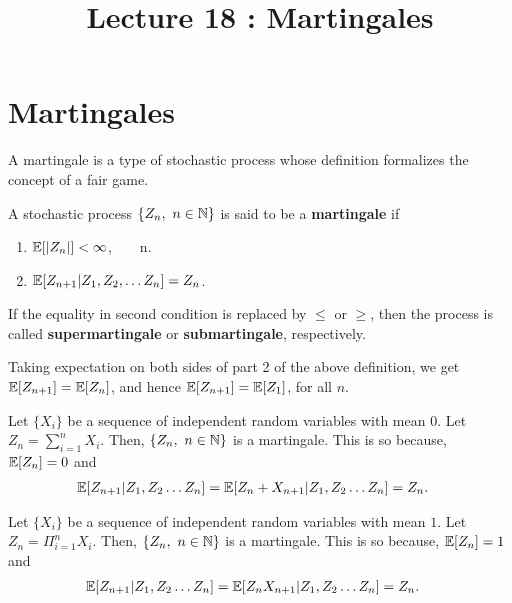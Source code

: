 \documentclass[a4paper,10pt,english]{article}
\title{Lecture 18 : Martingales}
\author{}
\begin{document}
\maketitle
\section{Martingales}
A martingale is a type of stochastic process whose definition formalizes the concept of a fair game.
\begin{defn}
A stochastic process $\{Z_n,~n \in \mathbb{N} \}$ is said to be a \textbf{martingale} if 
\begin{enumerate}
\item $\mathbb{E}[|Z_n|]< \infty$, ~ ~ n.
\item $\mathbb{E}[Z_{n+1}|Z_1,Z_2, \hdots Z_n]=Z_n$.
\end{enumerate}
If the equality in second condition is replaced by $\leq$ or $\geq$, then the process is called \textbf{supermartingale} or \textbf{submartingale}, respectively.
\end{defn}
\begin{rem} Taking expectation on both sides of part 2 of the above definition, we get $\mathbb{E}[Z_{n+1}]=\mathbb{E}[Z_n]$, and hence $\mathbb{E}[Z_{n+1}]=\mathbb{E}[Z_1]$, for all $n$.
\end{rem}
\begin{exmp}
Let $\{X_i\}$ be a sequence of independent random variables with mean $0$. Let $Z_n=\sum_{i=1}^n X_i$. Then, $\{Z_n,~n \in \mathbb{N} \}$ is a martingale. This is so because, $\mathbb{E}[Z_n]=0$ and 
\begin{align*}
\mathbb{E}[Z_{n+1}|Z_1,Z_2 \hdots Z_n] =\mathbb{E}[Z_{n}+X_{n+1}|Z_1,Z_2 \hdots Z_n]
&=Z_n.
\end{align*} 
\end{exmp}
\begin{exmp}
Let $\{X_i\}$ be a sequence of independent random variables with mean $1$. Let $Z_n=\Pi_{i=1}^n X_i$. Then, $\{Z_n,~n \in \mathbb{N} \}$ is a martingale. This is so because, $\mathbb{E}[Z_n]=1$ and 
\begin{align*}
\mathbb{E}[Z_{n+1}|Z_1,Z_2 \hdots Z_n] =\mathbb{E}[Z_{n}X_{n+1}|Z_1,Z_2 \hdots Z_n]
&=Z_n.
\end{align*} 
\end{exmp}
\end{document}
